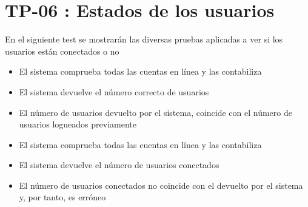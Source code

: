 \section{TP-06 : Estados de los usuarios}\label{sect:TP1}

En el siguiente test se mostrarán las diversas pruebas aplicadas a ver si los usuarios están conectados o no


{
\begin{itemize}
\item El sistema comprueba todas las cuentas en línea y las contabiliza
\item El sistema devuelve el número correcto de usuarios
\item El número de usuarios devuelto por el sistema, coincide con el número de usuarios logueados previamente 
\end{itemize}}{}

{
\begin{itemize}
\item El sistema comprueba todas las cuentas en línea y las contabiliza
\item El sistema devuelve el número de usuarios conectados
\item El número de usuarios conectados no coincide con el devuelto por el sistema y, por tanto, es erróneo
\end{itemize}}{}